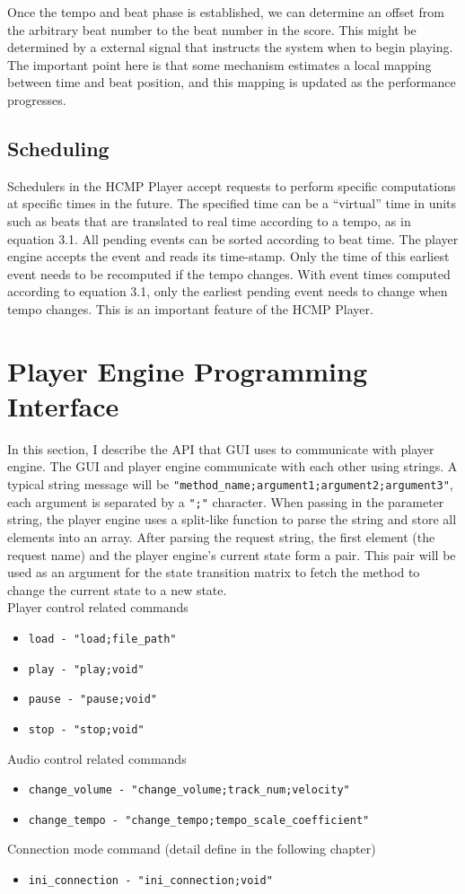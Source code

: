 Once the tempo and beat phase is established, we can determine an
offset from the arbitrary beat number to the beat number in the score. This might
be determined by a external signal that instructs the system when to begin 
playing. The important point here is that some mechanism estimates a local 
mapping between time and beat position, and this mapping is updated as 
the performance progresses.

\subsection{Scheduling}

Schedulers in the HCMP Player accept requests to perform specific
computations at specific times in the future. The specified time 
can be a ``virtual'' time in units such as beats that are translated to real 
time according to a tempo, as in equation 3.1. All pending events can be 
sorted according to beat time. The player engine accepts the event and 
reads its time-stamp. Only the time of this earliest event needs to be 
recomputed if the tempo changes. With event times computed according to 
equation 3.1, only the earliest pending event needs to change when tempo
changes. This is an important feature of the HCMP Player.

\section{Player Engine Programming Interface}
In this section, I describe the API that GUI uses to communicate with player 
engine. The GUI and player engine communicate with each other using strings.
A typical string message will be 
\texttt{"method\_name;argument1;argument2;argument3"}, each argument is 
separated by a \texttt{";"}
character. When passing in the parameter string, the player engine
uses a split-like function to parse the string and store all elements 
into an array. After parsing the request string, the first element 
(the request name) and the player engine's current state form a pair. 
This pair will be used as an argument for the state transition matrix
to fetch the method to change the current state to a new state.\\
Player control related commands 
\begin{itemize}
  \item \texttt{load - "load;file\_path"}
  \item \texttt{play - "play;void"}  
  \item \texttt{pause - "pause;void"}
  \item \texttt{stop - "stop;void"}
\end{itemize}
Audio control related commands 
\begin{itemize}
  \item \texttt{change\_volume - "change\_volume;track\_num;velocity"}  
  \item \texttt{change\_tempo - "change\_tempo;tempo\_scale\_coefficient"}  
\end{itemize}
Connection mode command (detail define in the following chapter)
\begin{itemize}
  \item \texttt{ini\_connection - "ini\_connection;void"}  
\end{itemize}
